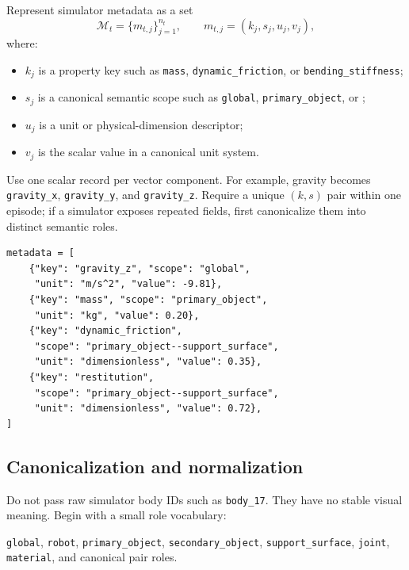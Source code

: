 \documentclass[11pt]{article}
\newcommand{\meta}{\mathcal M}
\begin{document}
Represent simulator metadata as a set
\begin{equation}
  \meta_t=\{m_{t,j}\}_{j=1}^{n_t},
  \qquad
  m_{t,j}=(k_j,s_j,u_j,v_j),
  \label{eq:metadata-set}
\end{equation}
where:
\begin{itemize}
  \item $k_j$ is a property key such as \texttt{mass},
  \texttt{dynamic\_friction}, or \texttt{bending\_stiffness};
  \item $s_j$ is a canonical semantic scope such as \texttt{global},
  \texttt{primary\_object}, or
  ;
  \item $u_j$ is a unit or physical-dimension descriptor;
  \item $v_j$ is the scalar value in a canonical unit system.
\end{itemize}

Use one scalar record per vector component.  For example, gravity becomes
\texttt{gravity\_x}, \texttt{gravity\_y}, and \texttt{gravity\_z}.  Require a
unique $(k,s)$ pair within one episode; if a simulator exposes repeated fields,
first canonicalize them into distinct semantic roles.

\begin{lstlisting}[style=pythonstyle,caption={Example variable-length metadata records.}]
metadata = [
    {"key": "gravity_z", "scope": "global",
     "unit": "m/s^2", "value": -9.81},
    {"key": "mass", "scope": "primary_object",
     "unit": "kg", "value": 0.20},
    {"key": "dynamic_friction",
     "scope": "primary_object--support_surface",
     "unit": "dimensionless", "value": 0.35},
    {"key": "restitution",
     "scope": "primary_object--support_surface",
     "unit": "dimensionless", "value": 0.72},
]
\end{lstlisting}

\subsection{Canonicalization and normalization}

Do not pass raw simulator body IDs such as \texttt{body\_17}.  They have no
stable visual meaning.  Begin with a small role vocabulary:
\begin{center}
\texttt{global}, \texttt{robot}, \texttt{primary\_object},
\texttt{secondary\_object}, \texttt{support\_surface}, \texttt{joint},
\texttt{material}, and canonical pair roles.
\end{center}
\end{document}
